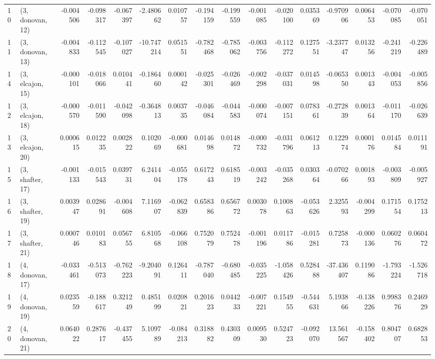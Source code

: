 \begin{tabular}{llrrrrrrrrrrrrrr}
10 &  (3, donovan, 12) &  -0.004506 & -0.098317 & -0.067397 &  -2.480662 &  0.010757 &  -0.194159 & -0.199559 & -0.001085 & -0.020100 &  0.035369 &  -0.970906 &  0.006453 & -0.070085 & -0.070051 \\
11 &  (3, donovan, 13) &  -0.004833 & -0.112545 & -0.107027 & -10.747214 &  0.051551 &  -0.782468 & -0.785062 & -0.003756 & -0.112272 &  0.127551 &  -3.237747 &  0.013256 & -0.241219 & -0.226489 \\
14 &  (3, elcajon, 15) &  -0.000101 & -0.018066 &  0.010441 &  -0.186460 &  0.000142 &  -0.025301 & -0.026469 & -0.002298 & -0.037031 &  0.014598 &  -0.065350 &  0.001343 & -0.004053 & -0.005856 \\
12 &  (3, elcajon, 18) &  -0.000570 & -0.011590 & -0.042098 &  -0.364813 &  0.003735 &  -0.046084 & -0.044583 & -0.000074 & -0.007151 &  0.078361 &  -0.272839 &  0.001364 & -0.011170 & -0.026639 \\
13 &  (3, elcajon, 20) &   0.000615 &  0.012235 &  0.002822 &   0.102069 & -0.000681 &   0.014698 &  0.014872 & -0.000732 & -0.031796 &  0.061213 &   0.122974 &  0.000176 &  0.014584 &  0.011191 \\
15 &  (3, shafter, 17) &  -0.001133 & -0.015543 &  0.039731 &   6.241404 & -0.055178 &   0.617243 &  0.618519 & -0.003242 & -0.035268 &  0.030364 &  -0.070266 &  0.001893 & -0.003809 & -0.005927 \\
16 &  (3, shafter, 19) &   0.003947 &  0.028691 & -0.004608 &   7.116907 & -0.062839 &   0.658386 &  0.656772 &  0.003078 &  0.100863 & -0.053626 &   2.325593 & -0.004299 &  0.171554 &  0.175213 \\
17 &  (3, shafter, 21) &   0.000746 &  0.010183 &  0.056755 &   6.810568 & -0.066108 &   0.752079 &  0.752478 & -0.001196 &  0.011786 & -0.015281 &   0.725873 & -0.000136 &  0.060276 &  0.060472 \\
18 &  (4, donovan, 17) &  -0.033461 & -0.513073 & -0.762223 &  -9.204091 &  0.126411 &  -0.787040 & -0.680485 & -0.035225 & -1.058426 &  0.528488 & -37.436407 &  0.119086 & -1.793224 & -1.526718 \\
19 &  (4, donovan, 19) &   0.023559 & -0.188617 &  0.321249 &   0.485199 &  0.020821 &   0.201623 &  0.044233 & -0.007221 &  0.154955 & -0.544631 &   5.193866 & -0.138226 &  0.998376 &  0.246929 \\
20 &  (4, donovan, 21) &   0.064022 &  0.287617 & -0.437455 &   5.109789 & -0.084213 &   0.318882 &  0.430309 &  0.009530 &  0.524723 & -0.092070 &  13.561567 & -0.158402 &  0.804707 &  0.682853 \\

\end{tabular}
